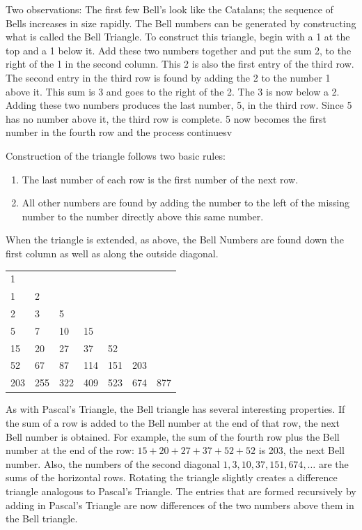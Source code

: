 \documentclass[10pt,]{book}
\theoremstyle{plain}
\theoremstyle{definition}
\theoremstyle{definition}
\theoremstyle{definition}
\theoremstyle{definition}
\numberwithin{equation}{chapter}
\begin{document}
\hypertarget{p-1240}{}%
Two observations: The first few Bell's look like the Catalans; the sequence of Bells increases in size rapidly. The Bell numbers can be generated by constructing what is called the Bell Triangle. To construct this triangle, begin with a 1 at the top and a 1 below it. Add these two numbers together and put the sum 2, to the right of the 1 in the second column. This 2 is also the first entry of the third row. The second entry in the third row is found by adding the 2 to the number 1 above it. This sum is 3 and goes to the right of the 2. The 3 is now below a 2. Adding these two numbers produces the last number, 5, in the third row. Since 5 has no number above it, the third row is complete. 5 now becomes the first number in the fourth row and the process continuesv%
\par
\hypertarget{p-1241}{}%
Construction of the triangle follows two basic rules: \leavevmode%
\begin{enumerate}
\item\hypertarget{li-228}{}\hypertarget{p-1242}{}%
The last number of each row is the first number of the next row.%
\item\hypertarget{li-229}{}\hypertarget{p-1243}{}%
All other numbers are found by adding the number to the left of the missing number to the number directly above this same number.%
\end{enumerate}
 When the triangle is extended, as above, the Bell Numbers are found down the first column as well as along the outside diagonal.%
\begin{sidebyside}{1}{0.15}{0.15}{0}
\begin{sbspanel}{0.7}
{\centering%
\begin{tabular}{lllllll}
1&&&&&&\tabularnewline[0pt]
1&2&&&&&\tabularnewline[0pt]
2&3&5&&&&\tabularnewline[0pt]
5&7&10&15&&&\tabularnewline[0pt]
15&20&27&37&52&&\tabularnewline[0pt]
52&67&87&114&151&203&\tabularnewline[0pt]
203&255&322&409&523&674&877
\end{tabular}
\par}
\end{sbspanel}
\end{sidebyside}
\par
\hypertarget{p-1244}{}%
As with Pascal's Triangle, the Bell triangle has several interesting properties. If the sum of a row is added to the Bell number at the end of that row, the next Bell number is obtained. For example, the sum of the fourth row plus the Bell number at the end of the row: \(15 + 20 + 27 + 37 + 52 + 52\) is 203, the next Bell number. Also, the numbers of the second diagonal \(1, 3, 10, 37, 151, 674, \ldots\) are the sums of the horizontal rows. Rotating the triangle slightly creates a difference triangle analogous to Pascal's Triangle. The entries that are formed recursively by adding in Pascal's Triangle are now differences of the two numbers above them in the Bell triangle.%
\end{document}
